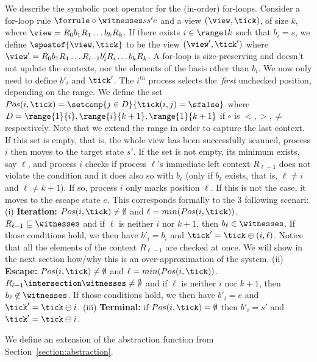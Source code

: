 We describe the symbolic post operator for the (in-order) for-loops. 
%
Consider a for-loop rule $\forrule \circ \witnesses s {s'} e $ and a
view $(\view,\tick)$, of size $k$, where $\view = R_0b_1R_1\ldots
b_kR_k$.
%
If there exists $i\in\range 1 k$ such that $b_i = s$, we define
$\spostof {\view,\tick}$ to be the view $(\view',\tick')$ where
$\view' = R_0b_1R_1\ldots R_{i-1}b'_iR_i\ldots b_kR_k$. A for-loop is
size-preserving and doesn't not update the contexts, nor the elements
of the basis other than $b_i$. We now only need to define $b'_i$ and
$\tick'$.
%
The $i^{th}$ process selects the~\emph{first} unchecked position,
depending on the range. %
We define the set %
$Pos(i,\tick) = \setcomp{j\in D}{\tick(i,j)=\sfalse}$ where
$D=\range{1}{i},\range{i}{k+1},\range{1}{k+1}$ if $\circ$ is
$<,>,\neq$ respectively. Note that we extend the range in order to
capture the last context.
%
If this set is empty, that is, the whole view has been successfully
scanned, process $i$ then moves to the target state $s'$.
%
If the set is not empty, its minimum exists, say $\ell$, and process
$i$ checks if process $\ell$'s immediate left context $R_{\ell-1}$
does not violate the condition and it does also so with $b_\ell$ (only
if $b_\ell$ exists, that is, $\ell\neq i$ and $\ell\neq k+1$). If so,
process $i$ only marks position $\ell$. If this is not the case, it
moves to the escape state $e$.
%
This corresponds formally to the 3 following scenari:
%
(i) {\bf Iteration:} $Pos(i,\tick)\neq\emptyset$ and
$\ell=min(Pos(i,\tick))$. %
$R_{\ell-1}\subseteq\witnesses$%
%
and %
if $\ell$ is neither $i$ nor $k+1$, then $b_\ell\in\witnesses$.
% 
If those conditions hold, we then have $b'_i=b_i$ and
$\tick'=\tick\oplus(i,\ell)$. %
Notice that all the elements of the context $R_{\ell-1}$ are checked
at once. We will show in the next section how/why this is an
over-approximation of the system.
%
(ii) {\bf Escape:} $Pos(i,\tick)\neq\emptyset$ and
$\ell=min(Pos(i,\tick))$. %
$R_{\ell-1}\intersection\witnesses\neq\emptyset$ and %
if $\ell$ is neither $i$ nor $k+1$, then $b_\ell\not\in\witnesses$.
% 
If those conditions hold, we then have $b'_i=e$ and
$\tick'=\tick\ominus i$.
% 
(iii) {\bf Terminal:} if $Pos(i,\tick)=\emptyset$ then $b'_i=s'$ and
$\tick'=\tick\ominus i$.
%
\begin{center}
\end{center}
%

We define an extension of the abstraction function from
Section~\ref{section:abstraction}. %

